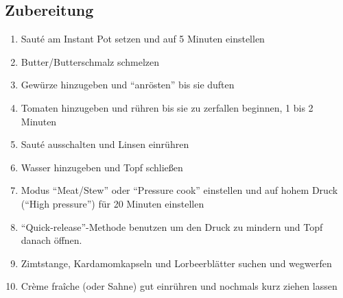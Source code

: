 \documentclass[version=last,fontsize=11pt,paper=A4]{scrartcl}
\begin{document}
\subsection*{Zubereitung}

\begin{enumerate}
    \item Sauté am Instant Pot setzen und auf 5 Minuten einstellen
    \item Butter/Butterschmalz schmelzen
    \item Gewürze hinzugeben und \enquote{anrösten} bis sie duften
    \item Tomaten hinzugeben und rühren bis sie zu zerfallen beginnen, 1 bis 2 Minuten
    \item Sauté ausschalten und Linsen einrühren
    \item Wasser hinzugeben und Topf schließen
    \item Modus \enquote{Meat/Stew} oder \enquote{Pressure cook} einstellen und auf hohem Druck (\enquote{High pressure}) für 20 Minuten einstellen
    \item \enquote{Quick-release}-Methode benutzen um den Druck zu mindern und Topf danach öffnen.
    \item Zimtstange, Kardamomkapseln und Lorbeerblätter suchen und wegwerfen
    \item Crème fraîche (oder Sahne) gut einrühren und nochmals kurz ziehen lassen
\end{enumerate}
\end{document}
